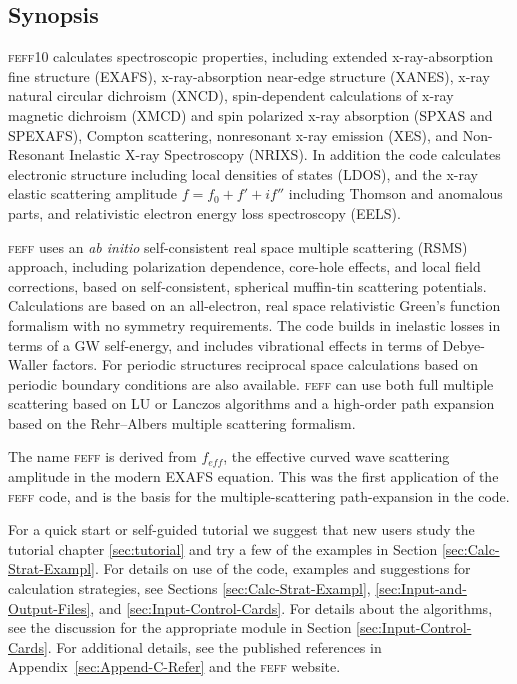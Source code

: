\documentclass[11pt,oneside]{report} %
\newcommand{\program}[1]{\textsc{#1}}
\newcommand{\feff}{\program{feff}}
\newcommand{\vnum}{10}
\newcommand{\feffcur}{\feff\vnum}
\begin{document}
\begin{latexonly}
\setcounter{page}{1}









\chapter{Synopsis}
\label{sec:Synopsis}

{\feffcur} calculates spectroscopic properties, including
extended x-ray-absorption fine structure (EXAFS), 
x-ray-absorption near-edge structure (XANES), x-ray
natural circular dichroism (XNCD), spin-dependent calculations 
of x-ray magnetic dichroism (XMCD) and spin polarized x-ray absorption 
(SPXAS and SPEXAFS), Compton scattering, nonresonant x-ray emission (XES), and Non-Resonant
Inelastic X-ray Spectroscopy (NRIXS). 
In addition the code calculates electronic structure including local
densities of states (LDOS), and the x-ray elastic scattering amplitude
$f=f_0+f'+if''$ including Thomson and anomalous parts, and relativistic
electron energy loss spectroscopy (EELS). 

{\feff} uses an \textit{ab initio} self-consistent real space multiple 
scattering (RSMS) approach, including 
polarization dependence, core\--hole effects, and local field 
corrections, based on self-consistent, spherical muffin-tin scattering
potentials.  Calculations are based on an all-electron, real space 
relativistic Green's function formalism with no symmetry requirements.
The code builds in inelastic losses in terms of a GW self-energy,
and includes vibrational effects in terms of Debye-Waller
factors.  For periodic structures reciprocal space calculations based on
periodic boundary conditions are also available.
{\feff} can use both full multiple scattering based on LU or Lanczos 
algorithms and a high-order path expansion based on the Rehr--Albers 
multiple scattering formalism.

The name {\feff} is derived from $f_{eff}$, the effective curved wave
scattering amplitude in the modern EXAFS equation.  This was the first
application of the {\feff} code, and is the basis for the 
multiple-scattering path-expansion in the code.

For a quick start or self-guided tutorial
we suggest that new users study the tutorial chapter \ref{sec:tutorial} and try a few of the examples in Section
\ref{sec:Calc-Strat-Exampl}. For details on use of the code, examples
and suggestions for calculation strategies, see Sections
\ref{sec:Calc-Strat-Exampl}, \ref{sec:Input-and-Output-Files}, and \ref{sec:Input-Control-Cards}. For details about the algorithms,
see the discussion for the appropriate module in Section
\ref{sec:Input-Control-Cards}.  For additional details, see the published
references in Appendix~\ref{sec:Append-C-Refer} and the {\feff} website.


\end{latexonly}
\end{document}
